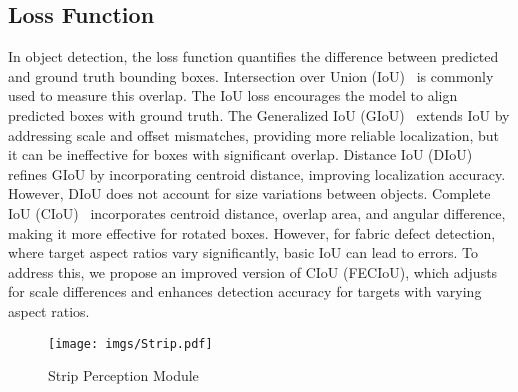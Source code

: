 \subsection{Loss Function}
In object detection, the loss function quantifies the difference between predicted and ground truth bounding boxes. Intersection over Union (IoU)~\cite{jiang_2018_acquisition} is commonly used to measure this overlap. The IoU loss encourages the model to align predicted boxes with ground truth. The Generalized IoU (GIoU)~\cite{rezatofighi_2019_generalized} extends IoU by addressing scale and offset mismatches, providing more reliable localization, but it can be ineffective for boxes with significant overlap.
Distance IoU (DIoU)~\cite{zheng_2019_distanceiou} refines GIoU by incorporating centroid distance, improving localization accuracy. However, DIoU does not account for size variations between objects. Complete IoU (CIoU)~\cite{zheng_2019_distanceiou} incorporates centroid distance, overlap area, and angular difference, making it more effective for rotated boxes. However, for fabric defect detection, where target aspect ratios vary significantly, basic IoU can lead to errors. To address this, we propose an improved version of CIoU (FECIoU), which adjusts for scale differences and enhances detection accuracy for targets with varying aspect ratios.


\begin{figure*}[t]
    \centering
    \texttt{[image: imgs/Strip.pdf]}
    \caption{Strip Perception Module}
\label{fig2}
\end{figure*}